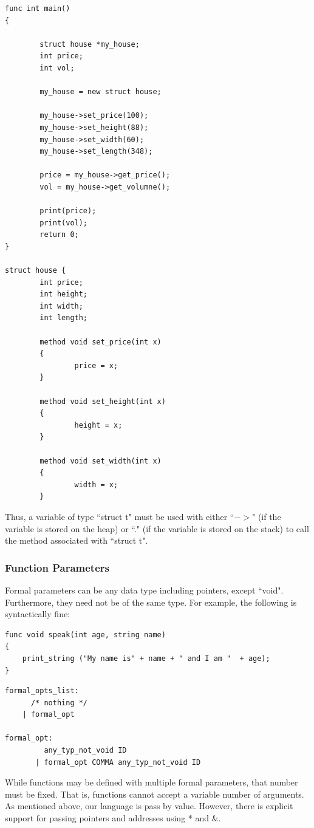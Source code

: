 \documentclass{article}
\begin{document}
\begin{lstlisting}
func int main()
{

        struct house *my_house;
        int price;
        int vol;

        my_house = new struct house;

        my_house->set_price(100);
        my_house->set_height(88);
        my_house->set_width(60);
        my_house->set_length(348);

        price = my_house->get_price();
        vol = my_house->get_volumne();

        print(price);
        print(vol);
        return 0;
}

struct house {
        int price;
        int height;
        int width;
        int length;

        method void set_price(int x)
        {
                price = x;
        }

        method void set_height(int x)
        {
                height = x;
        }

        method void set_width(int x)
        {
                width = x;
        }
\end{lstlisting}
Thus, a variable of type ``struct t" must be used with either ``$->$" (if the variable is stored on the heap) or ``." (if the variable is stored on the stack) to call the method associated with ``struct t". 

\subsubsection{Function Parameters}
Formal parameters can be any data type including pointers, except ``void". Furthermore, they need not be of the same type. For example, the following is syntactically fine:

\begin{lstlisting}
func void speak(int age, string name)
{
	print_string ("My name is" + name + " and I am "  + age);
}
\end{lstlisting}


\begin{Verbatim}[frame=single]
formal_opts_list:
	  /* nothing */ 
	| formal_opt 

formal_opt:
	     any_typ_not_void ID 		
	   | formal_opt COMMA any_typ_not_void ID 	
\end{Verbatim}


While functions may be defined with multiple formal parameters, that number must be fixed. That is, functions cannot accept a variable number of arguments. As mentioned above, our language is pass by value. However, there is explicit support for passing pointers and addresses using * and $\&$. 
\end{document}
